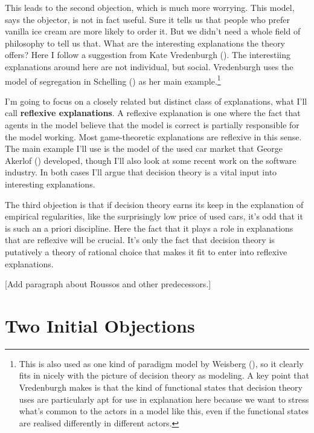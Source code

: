 \documentclass[
  11pt,
  letterpaper,
  DIV=11,
  numbers=noendperiod,
  twoside]{scrartcl}
\begin{document}
This leads to the second objection, which is much more worrying. This
model, says the objector, is not in fact useful. Sure it tells us that
people who prefer vanilla ice cream are more likely to order it. But we
didn't need a whole field of philosophy to tell us that. What are the
interesting explanations the theory offers? Here I follow a suggestion
from Kate Vredenburgh (). The
interestiing explanations around here are not individual, but social.
Vredenburgh uses the model of segregation in Schelling
() as her main example.\footnote{This
  is also used as one kind of paradigm model by Weisberg
  (), so it clearly fits in nicely
  with the picture of decision theory as modeling. A key point that
  Vredenburgh makes is that the kind of functional states that decision
  theory uses are particularly apt for use in explanation here because
  we want to stress what's common to the actors in a model like this,
  even if the functional states are realised differently in different
  actors.}

I'm going to focus on a closely related but distinct class of
explanations, what I'll call \textbf{reflexive explanations}. A
reflexive explanation is one where the fact that agents in the model
believe that the model is correct is partially responsible for the model
working. Most game-theoretic explanations are reflexive in this sense.
The main example I'll use is the model of the used car market that
George Akerlof () developed, though I'll
also look at some recent work on the software industry. In both cases
I'll argue that decision theory is a vital input into interesting
explanations.

The third objection is that if decision theory earns its keep in the
explanation of empirical regularities, like the surprisingly low price
of used cars, it's odd that it is such an a priori discipline. Here the
fact that it plays a role in explanations that are reflexive will be
crucial. It's only the fact that decision theory is putatively a theory
of rational choice that makes it fit to enter into reflexive
explanations.

{[}Add paragraph about Roussos and other predecessors.{]}

\section{Two Initial Objections}\label{sec-two}
\end{document}
